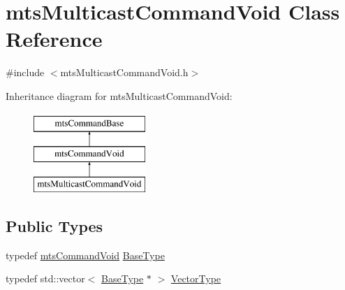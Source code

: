 \hypertarget{classmts_multicast_command_void}{}\section{mts\+Multicast\+Command\+Void Class Reference}
\label{classmts_multicast_command_void}


{\ttfamily \#include $<$mts\+Multicast\+Command\+Void.\+h$>$}

Inheritance diagram for mts\+Multicast\+Command\+Void\+:\begin{figure}[H]
\begin{center}
\leavevmode
\includegraphics[height=3.000000cm]{db/d1f/classmts_multicast_command_void}
\end{center}
\end{figure}
\subsection*{Public Types}
\begin{DoxyCompactItemize}
\item 
typedef \hyperlink{classmts_command_void}{mts\+Command\+Void} \hyperlink{classmts_multicast_command_void_a62fa2f55d19429b000f3cafc044b67a5}{Base\+Type}
\item 
typedef std\+::vector$<$ \hyperlink{classmts_command_void_aa0e2be86c520aef7b9c3a59e3cfbbce3}{Base\+Type} $\ast$ $>$ \hyperlink{classmts_multicast_command_void_a2d0478105f8fcc377056363ab5aa7fa0}{Vector\+Type}
\end{DoxyCompactItemize}
